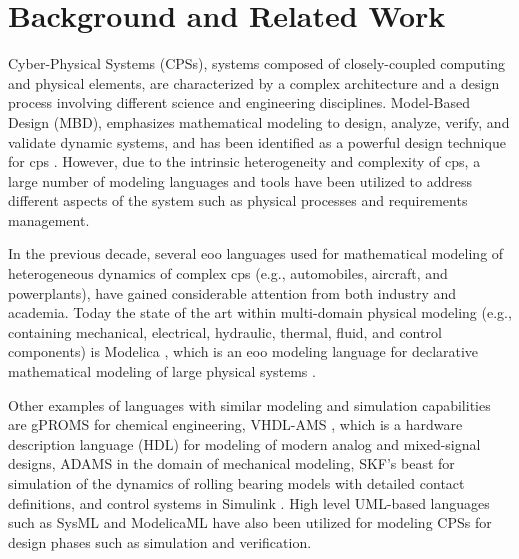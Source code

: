 

\chapter{Background and Related Work}
\label{cha:background}

Cyber-Physical Systems (CPSs), systems composed of closely-coupled computing and physical elements, are characterized by a complex architecture and a design process involving different science and engineering disciplines. Model-Based Design (MBD), emphasizes mathematical modeling to design, analyze, verify, and validate dynamic systems, and has been identified as a powerful design technique for \acrshort{cps} \cite{mbsdbalasubramanian,mbsdbrooks,mbsdkarasi}. However, due to the intrinsic heterogeneity and complexity of \acrshort{cps}, a large number of modeling languages and tools have been utilized to address different aspects of the system such as physical processes and requirements management.

In the previous decade, several \acrshort{eoo} languages used for mathematical modeling of heterogeneous dynamics of complex \acrshort{cps} (e.g., automobiles, aircraft, and powerplants), have gained considerable attention from both industry and academia. Today the state of the art within multi-domain physical modeling (e.g., containing mechanical, electrical, hydraulic, thermal, fluid, and control components) is Modelica \cite{modelica}, which is an \acrshort{eoo} modeling language for declarative mathematical modeling of large physical systems \cite{modelicahilding,modelicapeter,modelicapeterbook,modelicatiller}. 

Other examples of languages with similar modeling and simulation capabilities are gPROMS \cite{gproms,gpromsbarton,gpromsoh,gpromspaulphd} for chemical engineering, VHDL-AMS \cite{vhdlamsernst,vhdlamsieee}, which is a hardware description language (HDL) for modeling of modern analog and mixed-signal designs, ADAMS \cite{adams} in the domain of mechanical modeling, SKF’s \acrshort{beast} \cite{beast} for simulation of the dynamics of rolling bearing models with detailed contact definitions, and control systems in Simulink \cite{simulink}. High level UML-based languages such as SysML \cite{sysml,sysmlmorgan} and ModelicaML \cite{modelicaml,modelicamlreport,modelicamlverification,modelicamlwladimir} have also been utilized for modeling CPSs for design phases such as simulation and verification.

